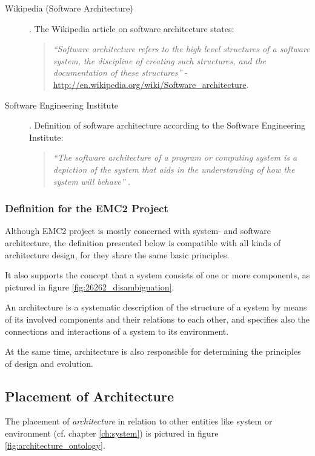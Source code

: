 \begin{description}
\item [Wikipedia (Software Architecture)].
The Wikipedia article on software architecture states:
\begin{quote}
\emph{``Software architecture refers to the high level structures of a software system, the discipline of creating such structures, and the documentation of these structures''} - \url{http://en.wikipedia.org/wiki/Software_architecture}.
\end{quote}

\item [Software Engineering Institute].
Definition of software architecture according to the Software Engineering Institute:
\begin{quote}
\emph{``The software architecture of a program or computing system is a depiction of the system that aids in the understanding of how the system will behave''} \cite{sei2}.
\end{quote}
\end{description}



\subsubsection{Definition for the EMC2 Project}
Although EMC2 project is mostly concerned with system- and software architecture, the definition presented below is compatible with all kinds of architecture design, for they share the same basic principles.

It also supports the concept that a system consists of one or more components, as pictured in figure \ref{fig:26262_disambiguation}.

\begin{myquote}
An architecture is a systematic description of the structure of a system by means of its involved components and their relations to each other, and specifies also the connections and interactions of a system to its environment.

At the same time, architecture is also responsible for determining the principles of design and evolution.
\end{myquote}


\subsection{Placement of Architecture}
The placement of \emph{architecture} in relation to other entities like system or environment (cf. chapter \ref{ch:system}) is pictured in figure \ref{fig:architecture_ontology}. 

